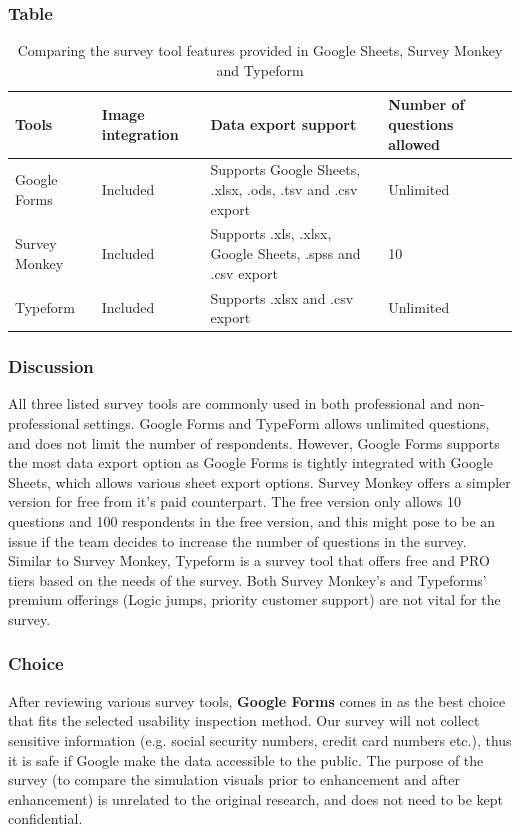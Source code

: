 \documentclass[10pt,journal,compsoc,draftclsnofoot]{IEEEtran}
\begin{document}
\subsubsection{Table}
\begin{center}
\begin{table}[H]
\begin{tabular}{ | m{10em} | m{15em} | m{15em} | m{15em} |  } 
\hline
\textbf{Tools}  & \textbf{Image integration} & \textbf{Data export support} & \textbf{Number of questions allowed} \\ \hline
Google Forms & Included  & Supports Google Sheets, .xlsx, .ods, .tsv and .csv export & Unlimited \\ \hline
Survey Monkey & Included & Supports .xls, .xlsx, Google Sheets, .spss and .csv export & 10 \\ \hline
Typeform & Included & Supports .xlsx and .csv export &  Unlimited \\ \hline 
\end{tabular}
\newline
\caption{Comparing the survey tool features provided in Google Sheets, Survey Monkey and Typeform}
\label{table:surveytool}
\end{table}
\end{center}

\newpage

\subsubsection{Discussion}
All three listed survey tools are commonly used in both professional and non-professional settings.
Google Forms and TypeForm allows unlimited questions, and does not limit the number of respondents.
However, Google Forms supports the most data export option as Google Forms is tightly integrated with Google Sheets, which allows various sheet export options.
Survey Monkey offers a simpler version for free from it's paid counterpart.
The free version only allows 10 questions and 100 respondents in the free version, and this might pose to be an issue if the team decides to increase the number of questions in the survey.
Similar to Survey Monkey, Typeform is a survey tool that offers free and PRO tiers based on the needs of the survey.
Both Survey Monkey's and Typeforms' premium offerings (Logic jumps, priority customer support) are not vital for the survey.

\subsubsection{Choice}
After reviewing various survey tools, \textbf{Google Forms} comes in as the best choice that fits the selected usability inspection method.
Our survey will not collect sensitive information (e.g. social security numbers, credit card numbers etc.), thus it is safe if Google make the data accessible to the public.
The purpose of the survey (to compare the simulation visuals prior to enhancement and after enhancement) is unrelated to the original research, and does not need to be kept confidential.
\end{document}
